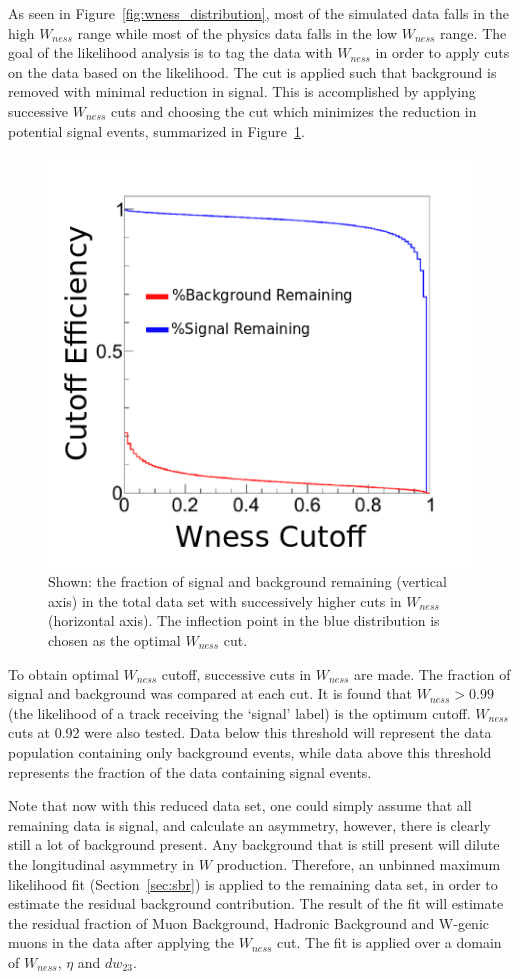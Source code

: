 As seen in Figure~\ref{fig:wness_distribution}, most of the simulated data falls
in the high $W_{ness}$ range while most of the physics data falls in the low
$W_{ness}$ range. The goal of the likelihood analysis is to tag the data with
$W_{ness}$ in order to apply cuts on the data based on the likelihood. The cut
is applied such that background is removed with minimal reduction in signal.
This is accomplished by applying successive $W_{ness}$ cuts and choosing the cut
which minimizes the reduction in potential signal events, summarized in
Figure~\ref{fig:wness_cut_efficiency}.

\begin{figure}[ht]
  \centering
  \includegraphics[width=0.7\linewidth]{./figures/wness_cut_efficiency.png}
  \caption{
		Shown: the fraction of signal and background remaining (vertical axis) in
		the total data set with successively higher cuts in $W_{ness}$ (horizontal
		axis). The inflection point in the blue distribution is chosen as the
		optimal $W_{ness}$ cut.
  }
  \label{fig:wness_cut_efficiency}
\end{figure}

To obtain optimal $W_{ness}$ cutoff, successive cuts in $W_{ness}$ are made. The
fraction of signal and background was compared at each cut. It is found that
$W_{ness} > 0.99$ (the likelihood of a track receiving the `signal' label) is
the optimum cutoff. $W_{ness}$ cuts at 0.92 were also tested. Data below this
threshold will represent the data population containing only background events,
while data above this threshold represents the fraction of the data containing
signal events.

Note that now with this reduced data set, one could simply assume that all
remaining data is signal, and calculate an asymmetry, however, there is clearly
still a lot of background present. Any background that is still present will
dilute the longitudinal asymmetry in $W$ production. Therefore, an unbinned
maximum likelihood fit (Section~\ref{sec:sbr}) is applied to the remaining data
set, in order to estimate the residual background contribution. The result of
the fit will estimate the residual fraction of Muon Background, Hadronic
Background and W-genic muons in the data after applying the $W_{ness}$ cut.  The
fit is applied over a domain of $W_{ness}$, $\eta$ and $dw_{23}$. 

